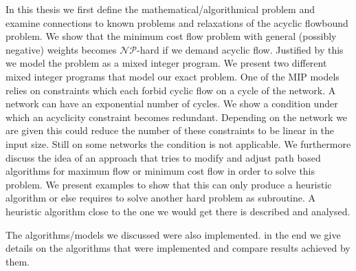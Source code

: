 In this thesis we first define the mathematical/algorithmical problem and examine connections to known problems and 
relaxations of the acyclic flowbound problem. We show that the minimum cost flow problem with general (possibly 
negative) weights becomes $\mathcal{NP}$-hard if we demand acyclic flow. 
Justified by this we model the problem as a mixed integer program. We present two different mixed integer programs 
that model our exact problem. One of the MIP models relies on constraints which each forbid cyclic flow on a cycle of 
the network. A network can have an exponential number of cycles. We show a condition under which an acyclicity 
constraint becomes redundant. Depending on the network we are given this could reduce the number of these constraints 
to be linear in the input size. Still on some networks the condition is not applicable.
We furthermore discuss the idea of an approach that tries to modify and adjust path based algorithms for maximum flow 
or minimum cost flow in order to solve this problem. We present examples to show that this can only produce a 
heuristic algorithm or else requires to solve another hard problem as subroutine. A heuristic algorithm close to the 
one we would get there is described and analysed.

The algorithms/models we discussed were also implemented. in the end we give details on the algorithms that were 
implemented and compare results achieved by them. 



